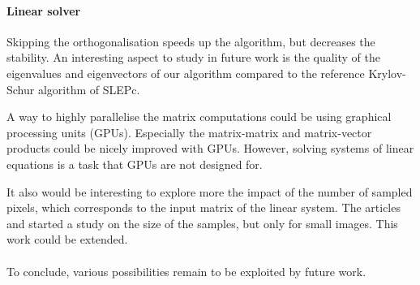 \ifthesis
 \paragraph{Linear solver}
 Skipping the orthogonalisation speeds up the algorithm, but decreases the stability.
 An interesting aspect to study in future work is the quality of the eigenvalues and eigenvectors of our algorithm compared to the reference Krylov-Schur algorithm of SLEPc.

 A way to highly parallelise the matrix computations could be using graphical processing units (GPUs).
 Especially the matrix-matrix and matrix-vector products could be nicely improved with GPUs.
 However, solving systems of linear equations is a task that GPUs are not designed for.

 It also would be interesting to explore more the impact of the number of sampled pixels, which corresponds to the input matrix of the linear system.
 The articles \cite{fowlkes_spectral_2004} and \cite{glide_2014} started a study on the size of the samples, but only for small images.
 This work could be extended.
\fi

\paragraph{}
To conclude, various possibilities remain to be exploited by future work.
